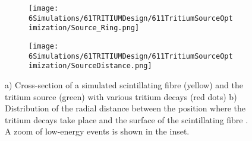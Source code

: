 \begin{figure}
\centering
    \begin{subfigure}[b]{0.5\textwidth}
    \centering
    \texttt{[image: 6Simulations/61TRITIUMDesign/611TritiumSourceOptimization/Source\_Ring.png]}  
    \caption{\label{subfig:TransversalCutTritiumSource}}
    \end{subfigure}
    \hfill
    \begin{subfigure}[b]{0.5\textwidth}
    \centering
    \texttt{[image: 6Simulations/61TRITIUMDesign/611TritiumSourceOptimization/SourceDistance.png]}  
    \caption{\label{subfig:DistanceDistributionTritiumSourceFiber}}
    \end{subfigure}
 \caption{a) Cross-section of a simulated scintillating fibre (yellow) and the tritium source (green) with various tritium decays (red dots) b) Distribution of the radial distance between the position where the tritium decays take place and the surface of the scintillating fibre \cite{SimulationPaperCarlos}. A zoom of low-energy events is shown in the inset.}
 \label{fig:TritiumSourceSimulated}
\end{figure}	

